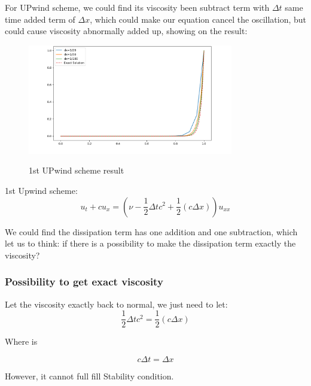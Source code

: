 \documentclass[12pt]{article}
\begin{document}
For UPwind scheme, we could find its viscosity been subtract 
term with $\Delta t$ same time added term of $\Delta x$, which
could make our equation cancel the oscillation, but could
cause viscosity abnormally added up, showing on the result:


\begin{figure}[H]
    \centering
    \includegraphics[width=0.8\textwidth]{figures/P2U1t0.1.png}
    \label{IGs.jpg}
    \caption{1st UPwind scheme result }
\end{figure}


1st Upwind scheme:
\[ u_t + c u_x = \left( \nu - \frac{1}{2} \Delta t c^2 + \frac{1}{2} (c \Delta x) \right) u_{xx} \]

We could find the dissipation term has one addition and one 
subtraction, which let us to think:
if there is a possibility to make the dissipation term exactly
the viscosity? 

\subsubsection{Possibility to get exact viscosity}

Let the viscosity exactly back to normal, we just need 
to let:
$$
\frac{1}{2} \Delta t c^2 = \frac{1}{2} (c \Delta x)
$$

Where is

$$
c \Delta t = \Delta x
$$

However, it cannot full fill Stability condition.
\end{document}
